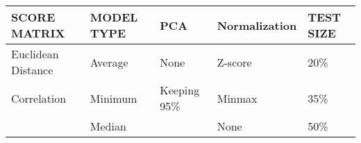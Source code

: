 \begin{tabular}{lllll}
\toprule
SCORE MATRIX            & MODEL TYPE & PCA          & Normalization & TEST SIZE &  \\
\midrule
Euclidean   Distance    & Average    & None         & Z-score                   & 20\%   &  \\
Correlation             & Minimum    & Keeping 95\% & Minmax                    & 35\%   &  \\
{}                      & Median     &  {}          & None                      & 50\%   &  \\

\bottomrule
\end{tabular}
